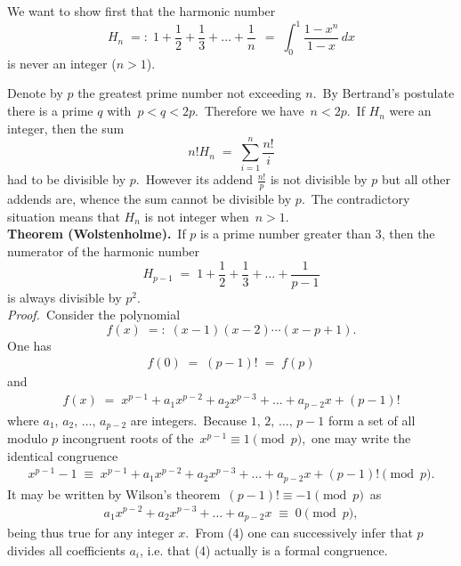 \documentclass[12pt]{article}
\theoremstyle{definition}
\begin{document}
We want to show first that the harmonic number
$$H_n \;=:\; 1+\frac{1}{2}+\frac{1}{3}+\ldots+\frac{1}{n}\, \;=\; \int_0^1\frac{1\!-\!x^n}{1\!-\!x}\,dx$$
is never an integer ($n > 1$).

Denote by $p$ the greatest prime number not exceeding $n$.\, By Bertrand's postulate there is a prime $q$ with\, 
$p < q < 2p$.\, Therefore we have\, $n < 2p$.\, If $H_n$ were an integer, then the sum
$$n!H_n \;=\; \sum_{i=1}^n\frac{n!}{i}$$
had to be divisible by $p$.\, However its addend $\displaystyle\frac{n!}{p}$ is not divisible by $p$ but all other addends are, whence the sum cannot be divisible by $p$.\, The contradictory situation means that $H_n$ is not integer when\, $n > 1$.\\


\textbf{Theorem (Wolstenholme).}\, If $p$ is a prime number greater than 3, then the numerator of the harmonic number
$$H_{p-1} \;=\; 1+\frac{1}{2}+\frac{1}{3}+\ldots+\frac{1}{p-1}$$
is always divisible by $p^2$.\\

\emph{Proof.}\, Consider the polynomial
$$f(x) \;=:\; (x\!-\!1)(x\!-\!2)\cdots(x\!-\!p\!+\!1).$$
One has
\begin{align}
f(0) \;=\; (p\!-\!1)! \;=\; f(p)
\end{align}
and
\begin{align}
f(x) \;=\; x^{p-1}+a_1x^{p-2}+a_2x^{p-3}+\ldots+a_{p-2}x+(p\!-1\!)!
\end{align}
where $a_1,\,a_2,\,\ldots,\,a_{p-2}$ are integers.\, Because $1,\,2,\,\ldots,\,p\!-\!1$ form a set of all modulo $p$ incongruent roots of the  \,$x^{p-1} \equiv 1 \pmod{p}$,\, one may write the identical congruence
\begin{align}
x^{p-1}\!-\!1 \;\equiv\; x^{p-1}+a_1x^{p-2}+a_2x^{p-3}+\ldots+a_{p-2}x+(p\!-1\!)! \pmod{p}.
\end{align}
It may be written by Wilson's theorem \,$(p\!-1\!)! \equiv -1 \pmod{p}$\, as
\begin{align}
a_1x^{p-2}+a_2x^{p-3}+\ldots+a_{p-2}x \;\equiv\; 0 \pmod{p},
\end{align}
being thus true for any integer $x$.\, From (4) one can successively infer that $p$ divides all coefficients $a_i$, i.e. that (4) actually is a formal congruence.
\end{document}
